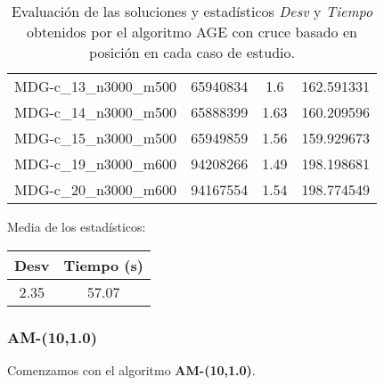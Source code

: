 \documentclass{article}
\begin{document}
\begin{table}[H]
\begin{tabular}{|cccc|}
		MDG-c\_13\_n3000\_m500 & 65940834 & 1.6 & 162.591331\\
		MDG-c\_14\_n3000\_m500 & 65888399 & 1.63 & 160.209596\\
		MDG-c\_15\_n3000\_m500 & 65949859 & 1.56 & 159.929673\\
		MDG-c\_19\_n3000\_m600 & 94208266 & 1.49 & 198.198681\\
		MDG-c\_20\_n3000\_m600 & 94167554 & 1.54 & 198.774549\\
		\hline
	\end{tabular}
	\caption{Evaluación de las soluciones y estadísticos \emph{Desv} y \emph{Tiempo} obtenidos por el algoritmo AGE con cruce basado en posición
		en cada caso de estudio.}
	\label{tab:age-posicion}
\end{table}

Media de los estadísticos:
\begin{table}[H]
	\centering
	\begin{tabular}{|cc|}
		\hline
		Desv & Tiempo (s)\\ \hline
		2.35 & 57.07 \\
		\hline
	\end{tabular}
\end{table}

\pagebreak

\subsubsection*{AM-(10,1.0)}

Comenzamos con el algoritmo \textbf{AM-(10,1.0)}.
\end{document}
